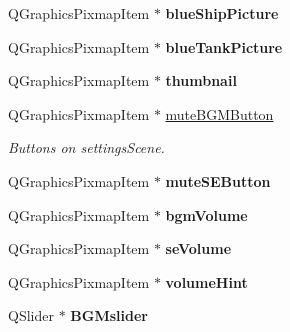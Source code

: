 \begin{DoxyCompactItemize}
\item 
Q\+Graphics\+Pixmap\+Item $\ast$ {\bfseries blue\+Ship\+Picture}\hypertarget{class_game_menu_ad46b5b1b90f4d0ce99790c8bc9d7832c}{}\label{class_game_menu_ad46b5b1b90f4d0ce99790c8bc9d7832c}

\item 
Q\+Graphics\+Pixmap\+Item $\ast$ {\bfseries blue\+Tank\+Picture}\hypertarget{class_game_menu_af70e2733344a7eeb1678c2666e3eb164}{}\label{class_game_menu_af70e2733344a7eeb1678c2666e3eb164}

\item 
Q\+Graphics\+Pixmap\+Item $\ast$ {\bfseries thumbnail}\hypertarget{class_game_menu_ab8ec0b01e303715a988e5e51cccb14de}{}\label{class_game_menu_ab8ec0b01e303715a988e5e51cccb14de}

\item 
Q\+Graphics\+Pixmap\+Item $\ast$ \hyperlink{class_game_menu_aaf654b46140ebb546578a3fefd72934c}{mute\+B\+G\+M\+Button}\hypertarget{class_game_menu_aaf654b46140ebb546578a3fefd72934c}{}\label{class_game_menu_aaf654b46140ebb546578a3fefd72934c}

\begin{DoxyCompactList}\small\item\em Buttons on settings\+Scene. \end{DoxyCompactList}\item 
Q\+Graphics\+Pixmap\+Item $\ast$ {\bfseries mute\+S\+E\+Button}\hypertarget{class_game_menu_a23666659fe3b9f0642fd53d308e9a8e0}{}\label{class_game_menu_a23666659fe3b9f0642fd53d308e9a8e0}

\item 
Q\+Graphics\+Pixmap\+Item $\ast$ {\bfseries bgm\+Volume}\hypertarget{class_game_menu_a693030c5c46cdb795d89879a2a362cc2}{}\label{class_game_menu_a693030c5c46cdb795d89879a2a362cc2}

\item 
Q\+Graphics\+Pixmap\+Item $\ast$ {\bfseries se\+Volume}\hypertarget{class_game_menu_a321abee561f05b81fb6e6570ce0b3203}{}\label{class_game_menu_a321abee561f05b81fb6e6570ce0b3203}

\item 
Q\+Graphics\+Pixmap\+Item $\ast$ {\bfseries volume\+Hint}\hypertarget{class_game_menu_a7ee482589366f76c2f28b85df5fe834a}{}\label{class_game_menu_a7ee482589366f76c2f28b85df5fe834a}

\item 
Q\+Slider $\ast$ {\bfseries B\+G\+Mslider}\hypertarget{class_game_menu_a2554f0222dad16e6943190265b4a063d}{}\label{class_game_menu_a2554f0222dad16e6943190265b4a063d}


\end{DoxyCompactItemize}
